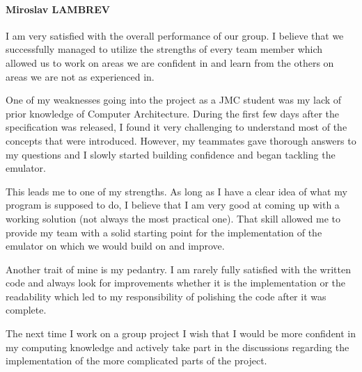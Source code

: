 \documentclass[11pt]{article}
\begin{document}
\paragraph{Miroslav LAMBREV} I am very satisfied with the overall performance of our group. I believe that we successfully managed to utilize the strengths of every team member which allowed us to work on areas we are confident in and learn from the others on areas we are not as experienced in.
\par One of my weaknesses going into the project as a JMC student was my lack of prior knowledge of Computer Architecture. During the first few days after the specification was released, I found it very challenging to understand most of the concepts that were introduced. However, my teammates gave thorough answers to my questions and I slowly started building confidence and began tackling the emulator.
\par This leads me to one of my strengths. As long as I have a clear idea of what my program is supposed to do, I believe that I am very good at coming up with a working solution (not always the most practical one). That skill allowed me to provide my team with a solid starting point for the implementation of the emulator on which we would build on and improve.
\par Another trait of mine is my pedantry. I am rarely fully satisfied with the written code and always look for improvements whether it is the implementation or the readability which led to my responsibility of polishing the code after it was complete.
\par The next time I work on a group project I wish that I would be more confident in my computing knowledge and actively take part in the discussions regarding the implementation of the more complicated parts of the project.
\end{document}
